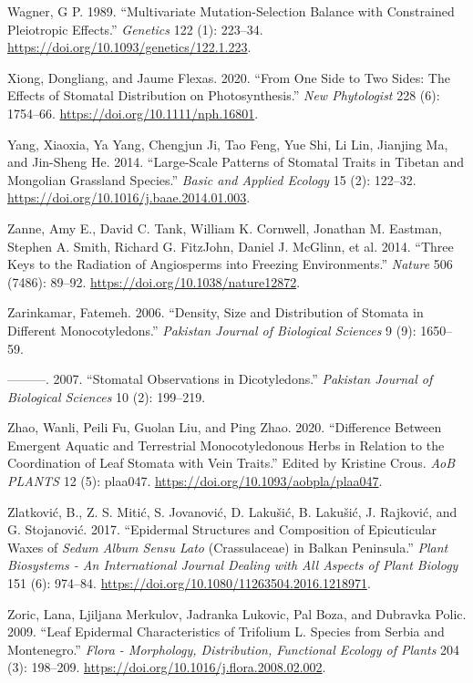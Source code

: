 \documentclass[
  12pt,
]{article}
\newlength{\cslhangindent}
\newlength{\cslentryspacingunit} %
\newenvironment{CSLReferences}[2] %
 {%
  \setlength{\parindent}{0pt}
  \ifodd #1
  \let\oldpar\par
  \def\par{\hangindent=\cslhangindent\oldpar}
  \fi
  \setlength{\parskip}{#2\cslentryspacingunit}
 }%
 {}
\begin{document}
\begin{CSLReferences}{1}{0}
\leavevmode{}%
Wagner, G P. 1989. {``Multivariate Mutation-Selection Balance with Constrained Pleiotropic Effects.''} \emph{Genetics} 122 (1): 223--34. \url{https://doi.org/10.1093/genetics/122.1.223}.

\leavevmode{}%
Xiong, Dongliang, and Jaume Flexas. 2020. {``From One Side to Two Sides: The Effects of Stomatal Distribution on Photosynthesis.''} \emph{New Phytologist} 228 (6): 1754--66. \url{https://doi.org/10.1111/nph.16801}.

\leavevmode{}%
Yang, Xiaoxia, Ya Yang, Chengjun Ji, Tao Feng, Yue Shi, Li Lin, Jianjing Ma, and Jin-Sheng He. 2014. {``Large-Scale Patterns of Stomatal Traits in {Tibetan} and {Mongolian} Grassland Species.''} \emph{Basic and Applied Ecology} 15 (2): 122--32. \url{https://doi.org/10.1016/j.baae.2014.01.003}.

\leavevmode{}%
Zanne, Amy E., David C. Tank, William K. Cornwell, Jonathan M. Eastman, Stephen A. Smith, Richard G. FitzJohn, Daniel J. McGlinn, et al. 2014. {``Three Keys to the Radiation of Angiosperms into Freezing Environments.''} \emph{Nature} 506 (7486): 89--92. \url{https://doi.org/10.1038/nature12872}.

\leavevmode{}%
Zarinkamar, Fatemeh. 2006. {``Density, Size and Distribution of Stomata in Different Monocotyledons.''} \emph{Pakistan Journal of Biological Sciences} 9 (9): 1650--59.

\leavevmode{}%
---------. 2007. {``Stomatal Observations in Dicotyledons.''} \emph{Pakistan Journal of Biological Sciences} 10 (2): 199--219.

\leavevmode{}%
Zhao, Wanli, Peili Fu, Guolan Liu, and Ping Zhao. 2020. {``Difference Between Emergent Aquatic and Terrestrial Monocotyledonous Herbs in Relation to the Coordination of Leaf Stomata with Vein Traits.''} Edited by Kristine Crous. \emph{AoB PLANTS} 12 (5): plaa047. \url{https://doi.org/10.1093/aobpla/plaa047}.

\leavevmode{}%
Zlatković, B., Z. S. Mitić, S. Jovanović, D. Lakušić, B. Lakušić, J. Rajković, and G. Stojanović. 2017. {``Epidermal Structures and Composition of Epicuticular Waxes of \emph{{Sedum} Album Sensu Lato} ({Crassulaceae}) in {Balkan} {Peninsula}.''} \emph{Plant Biosystems - An International Journal Dealing with All Aspects of Plant Biology} 151 (6): 974--84. \url{https://doi.org/10.1080/11263504.2016.1218971}.

\leavevmode{}%
Zoric, Lana, Ljiljana Merkulov, Jadranka Lukovic, Pal Boza, and Dubravka Polic. 2009. {``Leaf Epidermal Characteristics of {Trifolium} {L}. Species from {Serbia} and {Montenegro}.''} \emph{Flora - Morphology, Distribution, Functional Ecology of Plants} 204 (3): 198--209. \url{https://doi.org/10.1016/j.flora.2008.02.002}.

\end{CSLReferences}
\end{document}

